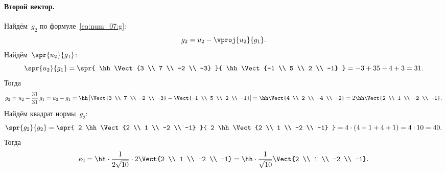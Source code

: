 \begin{solution}
	\paragraph{Второй вектор.}
	Найдём~$g_2$ по формуле~\eqref{eq:num_07:g}:
	\[
		g_2 =
		u_2 -
		\vproj{u_2}{g_1}
		.
	\]
	Найдём~$\spr{u_2}{g_1}$:
	\[
		\spr{u_2}{g_1} =
		\spr{
			\hh
			\Vect{3 \\ 7 \\ -2 \\ -3}
		}{
			\hh
			\Vect{-1 \\ 5 \\ 2 \\ -1}
		}
		=
		-3 + 35 - 4 + 3
		=
		31
		.
	\]
	Тогда
	\[
		g_2 =
		u_2 -
		\frac{31}{31}\,g_1
		=
		u_2 - g_1
		=
		\hh
		\left[ 
			\Vect{3 \\ 7 \\ -2 \\ -3}
			-
			\Vect{-1 \\ 5 \\ 2 \\ -1}
		\right]
		=
		\hh
		\Vect{4 \\ 2 \\ -4 \\ -2}
		=
		2
		\hh
		\Vect{2 \\ 1 \\ -2 \\ -1}
		.
	\]
	Найдём квадрат нормы~$g_2$:
	\[
		\spr{g_2}{g_2} =
		\spr{
			2
			\hh
			\Vect{2 \\ 1 \\ -2 \\ -1}
		}{
			2
			\hh
			\Vect{2 \\ 1 \\ -2 \\ -1}
		}
		=
		4 \cdot (4 + 1 + 4 + 1)
		=
		4 \cdot 10 = 40
		.
	\]
	Тогда
	\[
		e_2 =
		\hh
		\cdot
		\frac{1}{2\sqrt{10}}
		\cdot
		2
		\Vect{2 \\ 1 \\ -2 \\ -1}
		=
		\hh
		\cdot
		\frac{1}{\sqrt{10}}
		\Vect{2 \\ 1 \\ -2 \\ -1}
		.
	\]


\end{solution}
